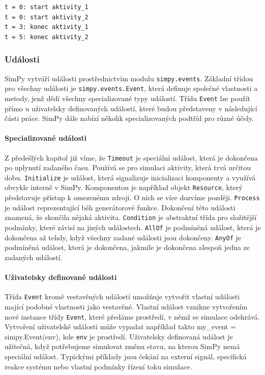\documentclass[
  program=itp,
  biblatex,
  figures=false,
  glossaries,
  index
]{kidiplom}
\begin{document}
 \begin{verbatim} 
t = 0: start aktivity_1
t = 0: start aktivity_2
t = 3: konec aktivity_1
t = 5: konec aktivity_2
\end{verbatim}

\subsubsection{Události}
SimPy vytváří události prostřednictvím modulu \texttt{simpy.events}. Základní třídou pro všechny události je \texttt{simpy.events.Event}, která definuje společné vlastnosti a metody, jenž dědí všechny specializované typy událostí. Třídu \texttt{Event} lze použít přímo u uživatelsky definovaných událostí, které budou představeny v následující části práce. SimPy dále nabízí několik specializovaných podtříd pro různé účely.

\paragraph{Specializované události}

Z předešlých kapitol již víme, že \texttt{Timeout} je speciální událost, která je dokončena po uplynutí zadaného času. Používá se pro simulaci aktivity, která trvá určitou dobu.
 \texttt{Initialize} je událost, která signalizuje inicializaci komponenty a využívá obvykle interně v SimPy. Komponentou je například objekt \texttt{Resource}, který představuje přístup k omezenému zdroji. O nich se více dozvíme později. \texttt{Process} je událost reprezentující běh generátorové funkce. Dokončení této události znamená, že skončila nějaká aktivita. \texttt{Condition} je abstraktní třída pro složitější podmínky, které závisí na jiných událostech. \texttt{AllOf} je podmíněná událost, která je dokončena až tehdy, když všechny zadané události jsou dokončeny. \texttt{AnyOf} je podmíněná událost, která je dokončena, jakmile je dokončena alespoň jedna ze zadaných událostí.

\paragraph{Uživatelsky definované události}

Třída \texttt{Event} kromě vestavěných událostí umožňuje vytvořit vlastní události mající podobné vlastnosti jako vestavěné. Vlastní událost vznikne vytvořením nové instance třídy \texttt{Event}, které předáme prostředí, v němž se simulace odehrává. Vytvoření uživatelské události může vypadat například takto {my\_event = simpy.Event(env)}, kde \texttt{env} je prostředí. Uživatelsky definovaná událost je užitečná, když potřebujeme simulovat změnu stavu, na kterou SimPy nemá speciální událost. Typickými příklady jsou čekání na externí signál, specifická reakce systému nebo vlastní podmínky řízení toku simulace.
\end{document}
